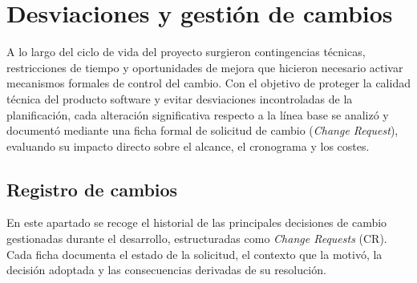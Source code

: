 \section{Desviaciones y gestión de cambios}\label{sec:desviaciones_y_gestion_cambios}

A lo largo del ciclo de vida del proyecto surgieron contingencias técnicas, restricciones de tiempo y oportunidades de mejora que hicieron necesario activar mecanismos formales de control del cambio. Con el objetivo de proteger la calidad técnica del producto software y evitar desviaciones incontroladas de la planificación, cada alteración significativa respecto a la línea base se analizó y documentó mediante una ficha formal de solicitud de cambio (\textit{Change Request}), evaluando su impacto directo sobre el alcance, el cronograma y los costes.

\subsection{Registro de cambios}\label{sub:registro_cambios}

En este apartado se recoge el historial de las principales decisiones de cambio gestionadas durante el desarrollo, estructuradas como \textit{Change Requests} (CR). Cada ficha documenta el estado de la solicitud, el contexto que la motivó, la decisión adoptada y las consecuencias derivadas de su resolución.

\begin{table}[H]
  \centering
  \small
  \renewcommand{\arraystretch}{1.4}
  \setlength{\tabcolsep}{12pt}
  \caption[CR-01: Aplazamiento de la defensa a octubre]{Registro de cambios - CR-01.}
  \label{tab:cr_01_aplazamiento}
\end{table}

